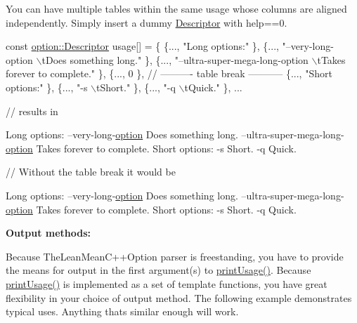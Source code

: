 You can have multiple tables within the same usage whose columns are aligned independently. Simply insert a dummy \hyperlink{structoption_1_1_descriptor}{Descriptor} with {\ttfamily help==0}.


\begin{DoxyCode}
\textcolor{keyword}{const} \hyperlink{structoption_1_1_descriptor}{option::Descriptor} usage[] = \{
\{..., \textcolor{stringliteral}{"Long options:"} \},
\{..., \textcolor{stringliteral}{"--very-long-option  \(\backslash\)tDoes something long."} \},
\{..., \textcolor{stringliteral}{"--ultra-super-mega-long-option  \(\backslash\)tTakes forever to complete."} \},
\{..., 0 \}, \textcolor{comment}{// ---------- table break -----------}
\{..., \textcolor{stringliteral}{"Short options:"} \},
\{..., \textcolor{stringliteral}{"-s  \(\backslash\)tShort."} \},
\{..., \textcolor{stringliteral}{"-q  \(\backslash\)tQuick."} \}, ...

\textcolor{comment}{// results in}

Long options:
--very-\textcolor{keywordtype}{long}-\hyperlink{namespaceoption}{option}              Does something \textcolor{keywordtype}{long}.
--ultra-super-mega-\textcolor{keywordtype}{long}-\hyperlink{namespaceoption}{option}  Takes forever to complete.
Short options:
-s  Short.
-q  Quick.

\textcolor{comment}{// Without the table break it would be}

Long options:
--very-\textcolor{keywordtype}{long}-\hyperlink{namespaceoption}{option}              Does something \textcolor{keywordtype}{long}.
--ultra-super-mega-\textcolor{keywordtype}{long}-\hyperlink{namespaceoption}{option}  Takes forever to complete.
Short options:
-s                              Short.
-q                              Quick.
\end{DoxyCode}


{\bfseries Output methods\+:}

Because The\+Lean\+Mean\+C++\+Option parser is freestanding, you have to provide the means for output in the first argument(s) to \hyperlink{namespaceoption_afc8bb7e040a98a0b33ff1ce9da1be0d1}{print\+Usage()}. Because \hyperlink{namespaceoption_afc8bb7e040a98a0b33ff1ce9da1be0d1}{print\+Usage()} is implemented as a set of template functions, you have great flexibility in your choice of output method. The following example demonstrates typical uses. Anything that\textquotesingle{}s similar enough will work.


